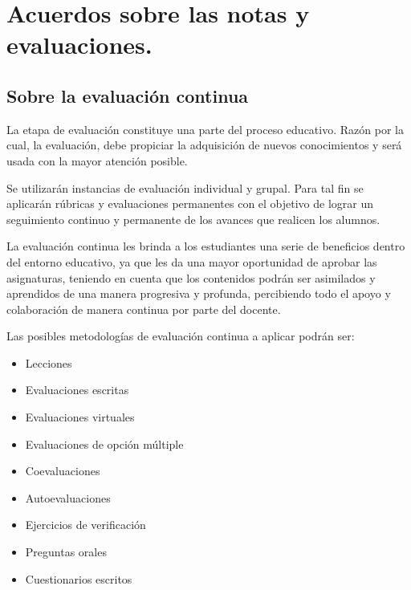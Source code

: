 \documentclass[../main]{subfiles}
\begin{document}
\section{Acuerdos sobre las notas y evaluaciones.} 

\subsection{ Sobre la evaluación continua}

La etapa de evaluación constituye una parte del proceso educativo. Razón por la cual, la evaluación, debe propiciar la adquisición de nuevos conocimientos y será usada con la mayor atención posible. 

Se utilizarán instancias de evaluación individual y grupal. Para tal fin se aplicarán rúbricas y evaluaciones permanentes con el objetivo de lograr un seguimiento continuo y permanente de los avances que realicen los alumnos. 

La evaluación continua les brinda a los estudiantes una serie de beneficios dentro del entorno educativo, ya que les da una mayor oportunidad de aprobar las asignaturas, teniendo en cuenta que los contenidos podrán ser asimilados y aprendidos de una manera progresiva y profunda, percibiendo todo el apoyo y colaboración de manera continua por parte del docente. 

Las posibles metodologías de evaluación continua a aplicar podrán ser: 
\begin{itemize}

\item Lecciones 

\item Evaluaciones escritas 

\item Evaluaciones virtuales

\item Evaluaciones de opción múltiple 

\item Coevaluaciones 

\item Autoevaluaciones 

\item Ejercicios de verificación 

\item Preguntas orales

\item Cuestionarios escritos 
\end{itemize}
\end{document}
